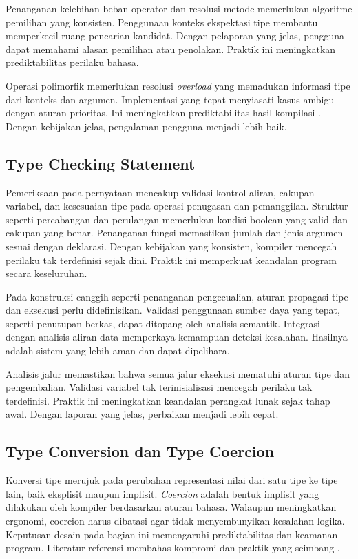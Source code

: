 \documentclass[../main.tex]{subfiles}
\begin{document}
Penanganan kelebihan beban operator dan resolusi metode memerlukan algoritme pemilihan yang konsisten. Penggunaan konteks ekspektasi tipe membantu memperkecil ruang pencarian kandidat. Dengan pelaporan yang jelas, pengguna dapat memahami alasan pemilihan atau penolakan. Praktik ini meningkatkan prediktabilitas perilaku bahasa.

Operasi polimorfik memerlukan resolusi \emph{overload} yang memadukan informasi tipe dari konteks dan argumen. Implementasi yang tepat menyiasati kasus ambigu dengan aturan prioritas. Ini meningkatkan prediktabilitas hasil kompilasi \citep{WikiTypeChecking}. Dengan kebijakan jelas, pengalaman pengguna menjadi lebih baik.

\subsection{Type Checking Statement}
Pemeriksaan pada pernyataan mencakup validasi kontrol aliran, cakupan variabel, dan kesesuaian tipe pada operasi penugasan dan pemanggilan. Struktur seperti percabangan dan perulangan memerlukan kondisi boolean yang valid dan cakupan yang benar. Penanganan fungsi memastikan jumlah dan jenis argumen sesuai dengan deklarasi. Dengan kebijakan yang konsisten, kompiler mencegah perilaku tak terdefinisi sejak dini. Praktik ini memperkuat keandalan program secara keseluruhan.

Pada konstruksi canggih seperti penanganan pengecualian, aturan propagasi tipe dan eksekusi perlu didefinisikan. Validasi penggunaan sumber daya yang tepat, seperti penutupan berkas, dapat ditopang oleh analisis semantik. Integrasi dengan analisis aliran data memperkaya kemampuan deteksi kesalahan. Hasilnya adalah sistem yang lebih aman dan dapat dipelihara.

Analisis jalur memastikan bahwa semua jalur eksekusi mematuhi aturan tipe dan pengembalian. Validasi variabel tak terinisialisasi mencegah perilaku tak terdefinisi. Praktik ini meningkatkan keandalan perangkat lunak sejak tahap awal. Dengan laporan yang jelas, perbaikan menjadi lebih cepat.

\subsection{Type Conversion dan Type Coercion}
Konversi tipe merujuk pada perubahan representasi nilai dari satu tipe ke tipe lain, baik eksplisit maupun implisit. \emph{Coercion} adalah bentuk implisit yang dilakukan oleh kompiler berdasarkan aturan bahasa. Walaupun meningkatkan ergonomi, coercion harus dibatasi agar tidak menyembunyikan kesalahan logika. Keputusan desain pada bagian ini memengaruhi prediktabilitas dan keamanan program. Literatur referensi membahas kompromi dan praktik yang seimbang \citep{WikiCoercion}.
\end{document}
